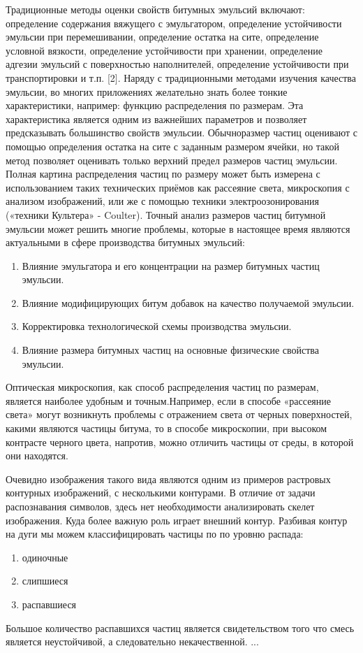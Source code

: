 Традиционные методы оценки свойств битумных эмульсий включают: определение содержания вяжущего с эмульгатором, определение устойчивости эмульсии при перемешивании, определение остатка на сите, определение условной вязкости, определение устойчивости при хранении, определение адгезии эмульсий с поверхностью наполнителей, определение устойчивости при транспортировки и т.п. [2].  Наряду с традиционными методами изучения  качества эмульсии, во многих приложениях желательно знать более тонкие характеристики, например: функцию распределения по размерам. Эта характеристика является одним из важнейших параметров и позволяет предсказывать большинство свойств эмульсии. Обычноразмер частиц оценивают с помощью определения остатка на сите с заданным размером ячейки, но такой метод позволяет оценивать только верхний предел размеров частиц эмульсии. Полная картина распределения частиц по размеру может быть измерена с использованием таких технических приёмов как рассеяние света, микроскопия с анализом изображений, или же с помощью техники электроозонирования («техники Культера» - Coulter). Точный анализ размеров частиц битумной эмульсии может решить многие проблемы, которые в настоящее время являются актуальными в сфере производства битумных эмульсий:
\begin{enumerate}
\item Влияние эмульгатора и его концентрации на размер битумных частиц эмульсии.
\item Влияние модифицирующих битум добавок на качество получаемой эмульсии.
\item Корректировка технологической схемы производства эмульсии.
\item Влияние размера битумных частиц на основные физические свойства эмульсии.
\end{enumerate}

Оптическая микроскопия, как способ распределения частиц по размерам, является наиболее удобным и точным.Например, если в способе «рассеяние света» могут возникнуть проблемы с отражением света от черных поверхностей, какими являются частицы битума, то в способе микроскопии, при высоком контрасте черного цвета, напротив, можно отличить частицы от среды, в которой они находятся.

Очевидно изображения такого вида являются одним из примеров растровых контурных изображений, с несколькими контурами. В отличие от задачи распознавания символов, здесь нет необходимости анализировать скелет изображения. Куда более важную роль играет внешний контур. Разбивая контур на дуги мы можем классифицировать частицы по по уровню распада:
\begin{enumerate}
\item одиночные
\item слипшиеся
\item распавшиеся
\end{enumerate}
Большое количество распавшихся частиц является свидетельством того что смесь является неустойчивой, а следовательно некачественной.
...

